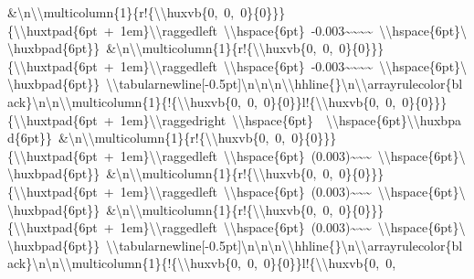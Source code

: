 \documentclass[
  english,
  man]{apa6}
\begin{document}
\&\textbackslash{}n\textbackslash{}\textbackslash{}multicolumn\{1\}\{r!\{\textbackslash{}\textbackslash{}huxvb\{0,\ 0,\ 0\}\{0\}\}\}\{\textbackslash{}\textbackslash{}huxtpad\{6pt\ +\ 1em\}\textbackslash{}\textbackslash{}raggedleft\ \textbackslash{}\textbackslash{}hspace\{6pt\}\ -0.003\textasciitilde{}\textasciitilde{}\textasciitilde{}\textasciitilde{}\ \textbackslash{}\textbackslash{}hspace\{6pt\}\textbackslash{}\textbackslash{}huxbpad\{6pt\}\}\ \&\textbackslash{}n\textbackslash{}\textbackslash{}multicolumn\{1\}\{r!\{\textbackslash{}\textbackslash{}huxvb\{0,\ 0,\ 0\}\{0\}\}\}\{\textbackslash{}\textbackslash{}huxtpad\{6pt\ +\ 1em\}\textbackslash{}\textbackslash{}raggedleft\ \textbackslash{}\textbackslash{}hspace\{6pt\}\ -0.003\textasciitilde{}\textasciitilde{}\textasciitilde{}\textasciitilde{}\ \textbackslash{}\textbackslash{}hspace\{6pt\}\textbackslash{}\textbackslash{}huxbpad\{6pt\}\}\ \textbackslash{}\textbackslash{}tabularnewline{[}-0.5pt{]}\textbackslash{}n\textbackslash{}n\textbackslash{}n\textbackslash{}\textbackslash{}hhline\{\}\textbackslash{}n\textbackslash{}\textbackslash{}arrayrulecolor\{black\}\textbackslash{}n\textbackslash{}n\textbackslash{}\textbackslash{}multicolumn\{1\}\{!\{\textbackslash{}\textbackslash{}huxvb\{0,\ 0,\ 0\}\{0\}\}l!\{\textbackslash{}\textbackslash{}huxvb\{0,\ 0,\ 0\}\{0\}\}\}\{\textbackslash{}\textbackslash{}huxtpad\{6pt\ +\ 1em\}\textbackslash{}\textbackslash{}raggedright\ \textbackslash{}\textbackslash{}hspace\{6pt\}\ \ \textbackslash{}\textbackslash{}hspace\{6pt\}\textbackslash{}\textbackslash{}huxbpad\{6pt\}\}\ \&\textbackslash{}n\textbackslash{}\textbackslash{}multicolumn\{1\}\{r!\{\textbackslash{}\textbackslash{}huxvb\{0,\ 0,\ 0\}\{0\}\}\}\{\textbackslash{}\textbackslash{}huxtpad\{6pt\ +\ 1em\}\textbackslash{}\textbackslash{}raggedleft\ \textbackslash{}\textbackslash{}hspace\{6pt\}\ (0.003)\textasciitilde{}\textasciitilde{}\textasciitilde{}\ \textbackslash{}\textbackslash{}hspace\{6pt\}\textbackslash{}\textbackslash{}huxbpad\{6pt\}\}\ \&\textbackslash{}n\textbackslash{}\textbackslash{}multicolumn\{1\}\{r!\{\textbackslash{}\textbackslash{}huxvb\{0,\ 0,\ 0\}\{0\}\}\}\{\textbackslash{}\textbackslash{}huxtpad\{6pt\ +\ 1em\}\textbackslash{}\textbackslash{}raggedleft\ \textbackslash{}\textbackslash{}hspace\{6pt\}\ (0.003)\textasciitilde{}\textasciitilde{}\textasciitilde{}\ \textbackslash{}\textbackslash{}hspace\{6pt\}\textbackslash{}\textbackslash{}huxbpad\{6pt\}\}\ \&\textbackslash{}n\textbackslash{}\textbackslash{}multicolumn\{1\}\{r!\{\textbackslash{}\textbackslash{}huxvb\{0,\ 0,\ 0\}\{0\}\}\}\{\textbackslash{}\textbackslash{}huxtpad\{6pt\ +\ 1em\}\textbackslash{}\textbackslash{}raggedleft\ \textbackslash{}\textbackslash{}hspace\{6pt\}\ (0.003)\textasciitilde{}\textasciitilde{}\textasciitilde{}\ \textbackslash{}\textbackslash{}hspace\{6pt\}\textbackslash{}\textbackslash{}huxbpad\{6pt\}\}\ \textbackslash{}\textbackslash{}tabularnewline{[}-0.5pt{]}\textbackslash{}n\textbackslash{}n\textbackslash{}n\textbackslash{}\textbackslash{}hhline\{\}\textbackslash{}n\textbackslash{}\textbackslash{}arrayrulecolor\{black\}\textbackslash{}n\textbackslash{}n\textbackslash{}\textbackslash{}multicolumn\{1\}\{!\{\textbackslash{}\textbackslash{}huxvb\{0,\ 0,\ 0\}\{0\}\}l!\{\textbackslash{}\textbackslash{}huxvb\{0,\ 0,\ 
\end{document}

